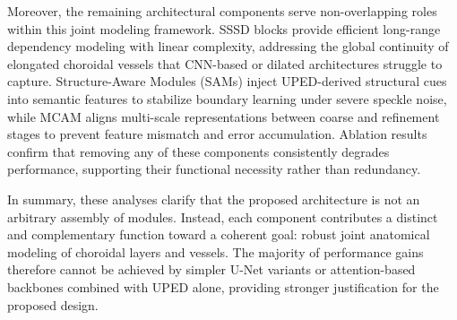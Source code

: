 \documentclass[11pt]{article}
\begin{document}
\begin{enumerate}
{    Moreover, the remaining architectural components serve non-overlapping roles within this joint modeling framework.
    SSSD blocks provide efficient long-range dependency modeling with linear complexity, addressing the global continuity of elongated choroidal vessels that CNN-based or dilated architectures struggle to capture.
    Structure-Aware Modules (SAMs) inject UPED-derived structural cues into semantic features to stabilize boundary learning under severe speckle noise, while MCAM aligns multi-scale representations between coarse and refinement stages to prevent feature mismatch and error accumulation.
    Ablation results confirm that removing any of these components consistently degrades performance, supporting their functional necessity rather than redundancy.
    
    In summary, these analyses clarify that the proposed architecture is not an arbitrary assembly of modules.
    Instead, each component contributes a distinct and complementary function toward a coherent goal: robust joint anatomical modeling of choroidal layers and vessels.
    The majority of performance gains therefore cannot be achieved by simpler U-Net variants or attention-based backbones combined with UPED alone, providing stronger justification for the proposed design.
    
}
\end{enumerate}
\end{document}
